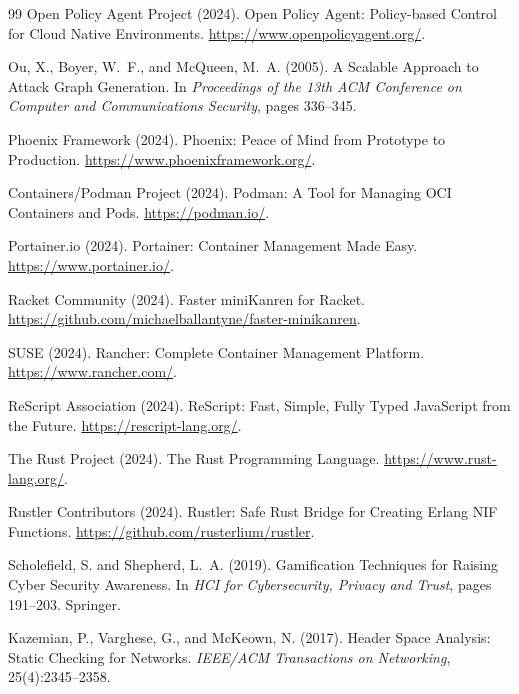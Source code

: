 \documentclass[11pt,twocolumn]{article}
\begin{document}
\begin{thebibliography}{99}
Open Policy Agent Project (2024).
\newblock Open Policy Agent: Policy-based Control for Cloud Native
Environments.
\newblock \url{https://www.openpolicyagent.org/}.

Ou, X., Boyer, W.~F., and McQueen, M.~A. (2005).
\newblock A Scalable Approach to Attack Graph Generation.
\newblock In \emph{Proceedings of the 13th ACM Conference on Computer
and Communications Security}, pages 336--345.

Phoenix Framework (2024).
\newblock Phoenix: Peace of Mind from Prototype to Production.
\newblock \url{https://www.phoenixframework.org/}.

Containers/Podman Project (2024).
\newblock Podman: A Tool for Managing OCI Containers and Pods.
\newblock \url{https://podman.io/}.

Portainer.io (2024).
\newblock Portainer: Container Management Made Easy.
\newblock \url{https://www.portainer.io/}.

Racket Community (2024).
\newblock Faster miniKanren for Racket.
\newblock \url{https://github.com/michaelballantyne/faster-minikanren}.

SUSE (2024).
\newblock Rancher: Complete Container Management Platform.
\newblock \url{https://www.rancher.com/}.

ReScript Association (2024).
\newblock ReScript: Fast, Simple, Fully Typed JavaScript from the
Future.
\newblock \url{https://rescript-lang.org/}.

The Rust Project (2024).
\newblock The Rust Programming Language.
\newblock \url{https://www.rust-lang.org/}.

Rustler Contributors (2024).
\newblock Rustler: Safe Rust Bridge for Creating Erlang NIF Functions.
\newblock \url{https://github.com/rusterlium/rustler}.

Scholefield, S. and Shepherd, L.~A. (2019).
\newblock Gamification Techniques for Raising Cyber Security Awareness.
\newblock In \emph{HCI for Cybersecurity, Privacy and Trust},
pages 191--203. Springer.

Kazemian, P., Varghese, G., and McKeown, N. (2017).
\newblock Header Space Analysis: Static Checking for Networks.
\newblock \emph{IEEE/ACM Transactions on Networking}, 25(4):2345--2358.


\end{thebibliography}
\end{document}
